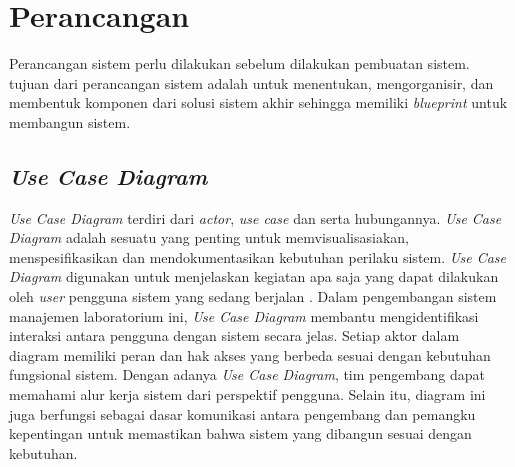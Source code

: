 \section{Perancangan}
Perancangan sistem perlu dilakukan sebelum dilakukan pembuatan sistem. tujuan dari perancangan sistem adalah untuk menentukan, mengorganisir, dan membentuk komponen dari solusi sistem akhir sehingga memiliki \textit{blueprint} untuk membangun sistem.

\subsection{\textit{Use Case Diagram}}
\textit{\textit{Use Case} Diagram} terdiri dari \textit{actor}, \textit{use case} dan serta hubungannya. \textit{\textit{Use Case Diagram}} adalah sesuatu yang penting untuk memvisualisasiakan, menspesifikasikan dan mendokumentasikan kebutuhan perilaku sistem. \textit{\textit{Use Case Diagram}} digunakan untuk menjelaskan kegiatan apa saja yang dapat dilakukan oleh \textit{user} pengguna sistem yang sedang berjalan \cite{Carstoiu1995}. Dalam pengembangan sistem manajemen laboratorium ini, \textit{Use Case Diagram} membantu mengidentifikasi interaksi antara pengguna dengan sistem secara jelas. Setiap aktor dalam diagram memiliki peran dan hak akses yang berbeda sesuai dengan kebutuhan fungsional sistem. Dengan adanya \textit{Use Case Diagram}, tim pengembang dapat memahami alur kerja sistem dari perspektif pengguna. Selain itu, diagram ini juga berfungsi sebagai dasar komunikasi antara pengembang dan pemangku kepentingan untuk memastikan bahwa sistem yang dibangun sesuai dengan kebutuhan.

